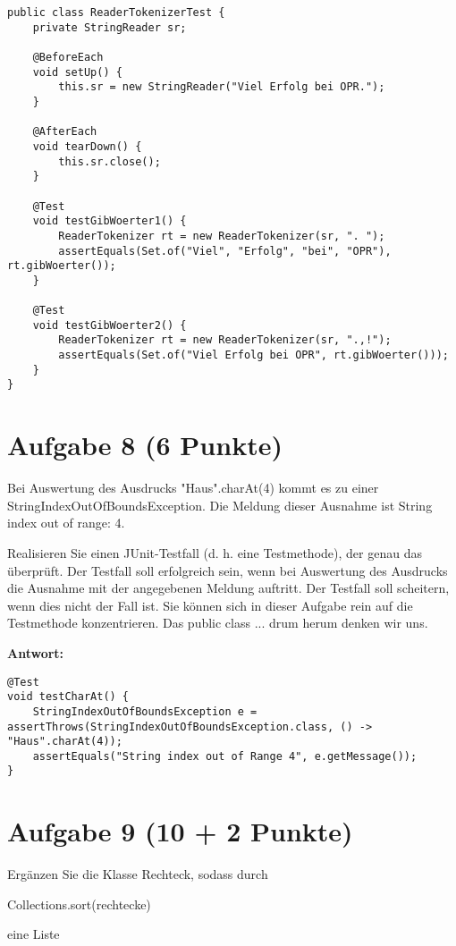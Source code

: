 \begin{lstlisting}
public class ReaderTokenizerTest {
    private StringReader sr;

    @BeforeEach
    void setUp() {
        this.sr = new StringReader("Viel Erfolg bei OPR.");
    }

    @AfterEach
    void tearDown() {
        this.sr.close();
    }

    @Test
    void testGibWoerter1() {
        ReaderTokenizer rt = new ReaderTokenizer(sr, ". ");
        assertEquals(Set.of("Viel", "Erfolg", "bei", "OPR"), rt.gibWoerter());
    }

    @Test
    void testGibWoerter2() {
        ReaderTokenizer rt = new ReaderTokenizer(sr, ".,!");
        assertEquals(Set.of("Viel Erfolg bei OPR", rt.gibWoerter()));
    }
}
\end{lstlisting}

\section{Aufgabe 8 (6 Punkte)}

Bei Auswertung des Ausdrucks "Haus".charAt(4) kommt es zu einer
StringIndexOutOfBoundsException. Die Meldung dieser Ausnahme ist String index
out of range: 4.

Realisieren Sie einen JUnit-Testfall (d. h. eine Testmethode), der genau das
überprüft. Der Testfall soll erfolgreich sein, wenn bei Auswertung des
Ausdrucks die Ausnahme mit der angegebenen Meldung auftritt. Der Testfall soll
scheitern, wenn dies nicht der Fall ist. Sie können sich in dieser Aufgabe rein
auf die Testmethode konzentrieren. Das public class ... drum herum denken wir
uns.

\textbf{Antwort:}

\begin{lstlisting}
@Test
void testCharAt() {
    StringIndexOutOfBoundsException e = assertThrows(StringIndexOutOfBoundsException.class, () -> "Haus".charAt(4));
    assertEquals("String index out of Range 4", e.getMessage());
}
\end{lstlisting}

\section{Aufgabe 9 (10 + 2 Punkte)}

Ergänzen Sie die Klasse Rechteck, sodass durch

Collections.sort(rechtecke)

eine Liste

